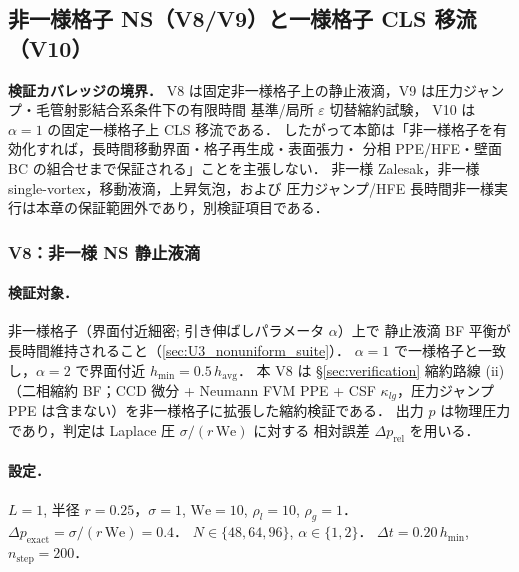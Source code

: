 %
\subsection{非一様格子 NS（V8/V9）と一様格子 CLS 移流（V10）}
\label{sec:nonuniform_grid_ns}

\noindent\textbf{検証カバレッジの境界．}
V8 は固定非一様格子上の静止液滴，V9 は圧力ジャンプ・毛管射影結合系条件下の有限時間 基準/局所 $\varepsilon$ 切替縮約試験，
V10 は $\alpha=1$ の固定一様格子上 CLS 移流である．
したがって本節は「非一様格子を有効化すれば，長時間移動界面・格子再生成・表面張力・
分相 PPE/HFE・壁面 BC の組合せまで保証される」ことを主張しない．
非一様 Zalesak，非一様 single-vortex，移動液滴，上昇気泡，および
圧力ジャンプ/HFE 長時間非一様実行は本章の保証範囲外であり，別検証項目である．

\subsubsection{V8：非一様 NS 静止液滴}
\label{sec:nonuniform_ns_static}

\paragraph{検証対象．}
非一様格子（界面付近細密; 引き伸ばしパラメータ $\alpha$）上で
静止液滴 BF 平衡が長時間維持されること（\autoref{sec:U3_nonuniform_suite}）．
$\alpha = 1$ で一様格子と一致し，$\alpha = 2$ で界面付近 $h_{\min} = 0.5\, h_{\mathrm{avg}}$．
本 V8 は §\ref{sec:verification} 縮約路線 (ii)（二相縮約 BF；CCD 微分 + Neumann FVM PPE
+ CSF $\kappa_{lg}$，圧力ジャンプ PPE は含まない）を非一様格子に拡張した縮約検証である．
出力 $p$ は物理圧力であり，判定は Laplace 圧 $\sigma/(r\,\mathrm{We})$ に対する
相対誤差 $\Delta p_{\mathrm{rel}}$ を用いる．

\paragraph{設定．}
$L=1$, 半径 $r=0.25$，$\sigma=1$, $\mathrm{We}=10$,
$\rho_l=10$, $\rho_g=1$．
$\Delta p_{\mathrm{exact}} = \sigma/(r\,\mathrm{We}) = 0.4$．
$N \in \{48, 64, 96\}$, $\alpha \in \{1, 2\}$．
$\Delta t = 0.20\,h_{\min}$, $n_{\mathrm{step}} = 200$．

